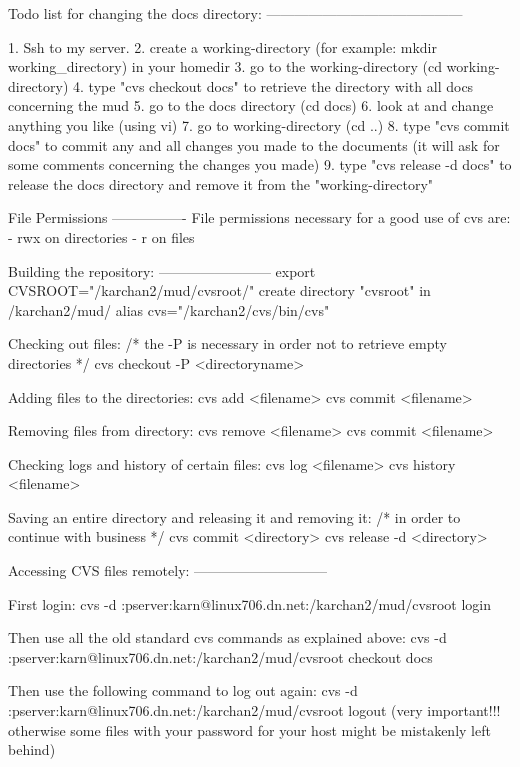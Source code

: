 Todo list for changing the docs directory:
------------------------------------------

1. Ssh to my server.
2. create a working-directory (for example: mkdir working_directory) in your homedir
3. go to the working-directory (cd working-directory)
4. type "cvs checkout docs" to retrieve the directory with all docs concerning the mud
5. go to the docs directory (cd docs)
6. look at and change anything you like (using vi)
7. go to working-directory (cd ..)
8. type "cvs commit docs" to commit any and all changes you made to the documents (it will ask for some comments concerning the changes you made)
9. type "cvs release -d docs" to release the docs directory and remove it from the "working-directory"

File Permissions
----------------
File permissions necessary for a good use of cvs are:
- rwx on directories
- r on files


Building the repository:
------------------------
export CVSROOT="/karchan2/mud/cvsroot/"
create directory "cvsroot" in /karchan2/mud/
alias cvs="/karchan2/cvs/bin/cvs"

Checking out files:
/* the -P is necessary in order not to retrieve empty directories */
cvs checkout -P <directoryname>

Adding files to the directories:
cvs add <filename>
cvs commit <filename>

Removing files from directory:
cvs remove <filename>
cvs commit <filename>

Checking logs and history of certain files:
cvs log <filename>
cvs history <filename>

Saving an entire directory and releasing it and removing it:
/* in order to continue with business */
cvs commit <directory>
cvs release -d <directory>

Accessing CVS files remotely:
-----------------------------

First login:
cvs -d :pserver:karn@linux706.dn.net:/karchan2/mud/cvsroot login         

Then use all the old standard cvs commands as explained above:
cvs -d :pserver:karn@linux706.dn.net:/karchan2/mud/cvsroot checkout docs

Then use the following command to log out again:
cvs -d :pserver:karn@linux706.dn.net:/karchan2/mud/cvsroot logout         
(very important!!! otherwise some files with your password for your host might be mistakenly left behind)


